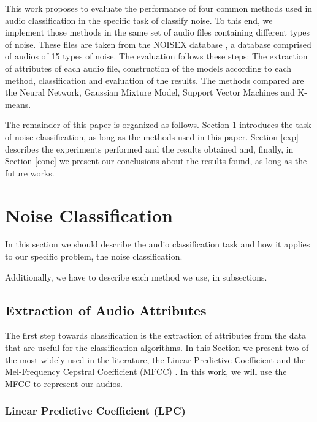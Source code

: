 \documentclass[12pt]{article}
\begin{document}
This work proposes to evaluate the performance of four common methods used in audio classification in the specific task of classify noise. To this end, we implement those methods in the same set of audio files containing different types of noise. These files are taken from the NOISEX database \cite{varga1993assessment}, a database comprised of audios of 15 types of noise. The evaluation follows these steps: The extraction of attributes of each audio file, construction of the models according to each method, classification and evaluation of the results. The methods compared are the Neural Network, Gaussian Mixture Model, Support Vector Machines and K-means.

The remainder of this paper is organized as follows. Section \ref{class} introduces the task of noise classification, as long as the methods used in this paper. Section \ref{exp} describes the experiments performed and the results obtained and, finally, in Section \ref{conc} we present our conclusions about the results found, as long as the future works.

\section{Noise Classification} \label{class}

In this section we should describe the audio classification task and how it applies to our specific problem, the noise classification.

Additionally, we have to describe each method we use, in subsections.

\subsection{Extraction of Audio Attributes} \label{class:audioatt}

The first step towards classification is the extraction of attributes from the data that are useful for the classification algorithms. In this Section we present two of the most widely used in the literature, the Linear Predictive Coefficient \cite{Rabiner:1993:FSR:153687} and the Mel-Frequency Cepstral Coefficient (MFCC) \cite{xu2005automatic}. In this work, we will use the MFCC to represent our audios.

\subsubsection{Linear Predictive Coefficient (LPC)}\label{class:lpc}
\end{document}
